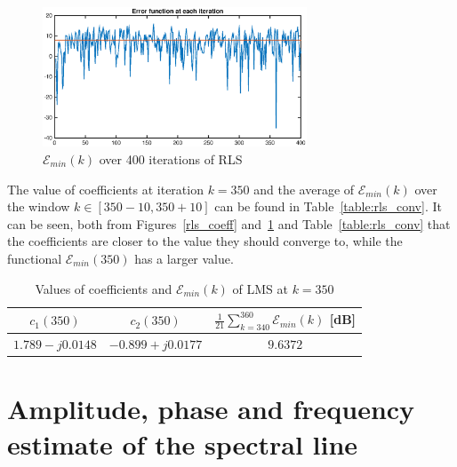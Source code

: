 \documentclass[10pt]{article}
\numberwithin{equation}{section}
\begin{document}
\begin{figure}[h!]
  \centering
  \includegraphics[width = 0.7\textwidth]{images/rls_err}
  \caption{$\mathcal{E}_{min}(k)$ over 400 iterations of RLS}
  \label{fig:err_rls}
\end{figure}

The value of coefficients at iteration $k = 350$ and the average of $\mathcal{E}_{min}(k)$ over the window $k \in [350 - 10, 350 + 10]$ can be found in Table~\ref{table:rls_conv}. It can be seen, both from Figures~\ref{rls_coeff} and~\ref{fig:err_rls} and Table~\ref{table:rls_conv} that the coefficients are closer to the value they should converge to, while the functional $\mathcal{E}_{min}(350)$ has a larger value.

\begin{table}[h!]
  \centering
  \begin{tabular}{c|c|c}
    $c_1(350)$ &   $c_2(350)$ & $\frac{1}{21}\sum_{k=340}^{360} \mathcal{E}_{min}(k)$ [dB] \\ \hline
    $1.789 - j0.0148$ & $-0.899 + j0.0177$ & $9.6372$
  \end{tabular}
  \caption{Values of coefficients and $\mathcal{E}_{min}(k)$ of LMS at $k=350$}
  \label{table:lms_conv}
\end{table}

\section{Amplitude, phase and frequency estimate of the spectral line}
\end{document}
